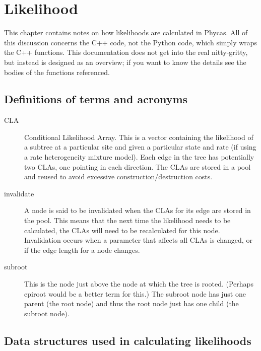 \chapter{Likelihood} 

This chapter contains notes on how likelihoods are calculated in Phycas. All of this discussion concerns the C++ code, not the Python code, which simply wraps the C++ functions. This documentation does not get into the real nitty-gritty, but instead is designed as an overview; if you want to know the details see the bodies of the functions referenced.

\section{Definitions of terms and acronyms}
\begin{description}
\item[CLA] Conditional Likelihood Array. This is a vector containing the likelihood of a subtree at a particular site and given a particular state and rate (if using a rate heterogeneity mixture model). Each edge in the tree has potentially two CLAs, one pointing in each direction. The CLAs are stored in a pool and reused to avoid excessive construction/destruction costs.
\item[invalidate] A node is said to be invalidated when the CLAs for its edge are stored in the pool. This means that the next time the likelihood needs to be calculated, the CLAs will need to be recalculated for this node. Invalidation occurs when a parameter that affects all CLAs is changed, or if the edge length for a node changes. 
\item[subroot] This is the node just above the node at which the tree is rooted. (Perhaps epiroot would be a better term for this.) The subroot node has just one parent (the root node) and thus the root node just has one child (the subroot node).
\end{description}

\section{Data structures used in calculating likelihoods}

